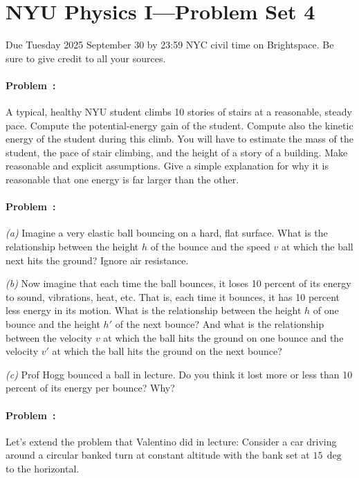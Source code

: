 \documentclass[12pt]{article}
\begin{document}
\section*{NYU Physics I---Problem Set 4}

Due Tuesday 2025 September 30 by 23:59 NYC civil time on Brightspace.
Be sure to give credit to all your sources.

\paragraph{Problem~\theproblem:}%
A typical, healthy NYU student climbs 10 stories of stairs at a
reasonable, steady pace. Compute the potential-energy gain of the
student. Compute also the kinetic energy of the student during this
climb. You will have to estimate the mass of the student, the pace of
stair climbing, and the height of a story of a building. Make
reasonable and explicit assumptions. Give a simple explanation for why
it is reasonable that one energy is far larger than the other.

\paragraph{Problem~\theproblem:}%
\textsl{(a)} Imagine a very elastic ball bouncing on a hard, flat
surface. What is the relationship between the height $h$ of the bounce
and the speed $v$ at which the ball next hits the ground?  Ignore air
resistance.

\textsl{(b)} Now imagine that each time the ball bounces, it loses 10
percent of its energy to sound, vibrations, heat, etc.  That is, each
time it bounces, it has 10 percent less energy in its motion.  What is
the relationship between the height $h$ of one bounce and the height
$h'$ of the next bounce?  And what is the relationship between the
velocity $v$ at which the ball hits the ground on one bounce and the
velocity $v'$ at which the ball hits the ground on the next bounce?

\textsl{(c)} Prof Hogg bounced a ball in lecture. Do you think it
lost more or less than 10 percent of its energy per bounce? Why?

\paragraph{Problem~\theproblem:}%
Let's extend the problem that Valentino did in lecture:
Consider a car driving around a circular banked turn at
constant altitude with the bank set at $15\,\deg$ to the horizontal.
\end{document}
